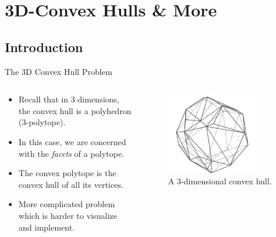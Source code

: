 \documentclass{beamer}
\begin{document}
\section{3D-Convex Hulls \& More}
\subsection*{Introduction}
\begin{frame}{The 3D Convex Hull Problem}
\begin{columns}[T]
\begin{column}{0.46\textwidth}
    \begin{itemize}
        \item Recall that in 3 dimensions, the convex hull is a polyhedron (3-polytope). 
        \item In this case, we are concerned with the \textit{facets} of a polytope.
        \item The convex polytope is the convex hull of all its vertices. 
        \item More complicated problem which is harder to visualize and implement. 
    \end{itemize}
\end{column}
\hfill
\begin{column}{0.4\textwidth}
    \begin{figure}
        \centering
        \includegraphics[width=0.8\textwidth]{3dhull.png}
        \caption{A 3-dimensional convex hull.}
    \end{figure}
\end{column}
\end{columns}
\end{frame}
\end{document}
